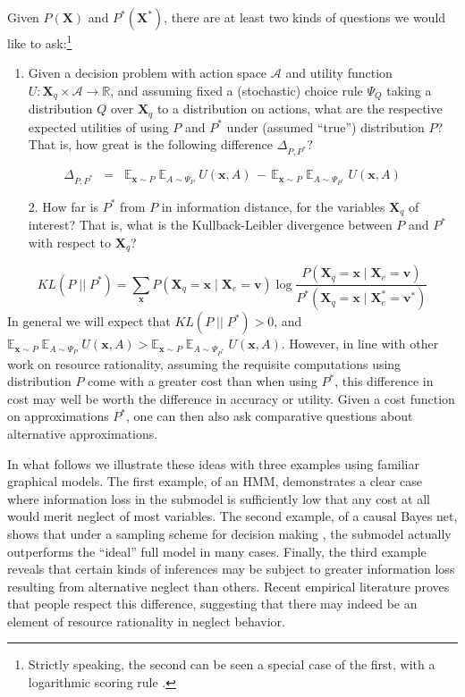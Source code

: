 \documentclass[10pt,letterpaper]{article}
\begin{document}
Given $P(\textbf{X})$ and $P^*(\textbf{X}^*)$, there are at least two kinds of questions we would like to ask:\footnote{Strictly speaking, the second can be seen a special case of the first, with a logarithmic scoring rule \citep{Bernardo}.} \begin{enumerate}
  \item Given a decision problem with action space $\mathcal{A}$ and utility function $U:\textbf{X}_q\times \mathcal{A} \rightarrow\mathbb{R}$, and assuming fixed a (stochastic) choice rule $\Psi_Q$ taking a distribution $Q$ over $\textbf{X}_q$ to a distribution on actions, what are the respective expected utilities of using $P$ and $P^*$ under (assumed ``true'') distribution $P$? That is, how great is the following difference $\Delta_{P,P^*}$? \end{enumerate}
  $$\Delta_{P,P^*} \;\; = \;\; \mathbb{E}_{\textbf{x}\sim P}\;\mathbb{E}_{A \sim \Psi_{P}}\;U(\textbf{x},A) \,-\, \mathbb{E}_{\textbf{x} \sim P}\;\mathbb{E}_{A \sim \Psi_{P^*}}\;U(\textbf{x},A)$$
  \begin{enumerate}
  \item[2.] How far is $P^*$ from $P$ in information distance, for the variables $\textbf{X}_q$ of interest? That is, what is the Kullback-Leibler divergence between $P$ and $P^*$ with respect to $\textbf{X}_q$?
\end{enumerate}$$KL(P \;||\; P^*)  =  \sum_{\textbf{x}} P(\textbf{X}_q = \textbf{x} \mid \textbf{X}_{e} = \textbf{v})\; \mbox{log} \; \frac{P(\textbf{X}_q = \textbf{x} \mid \textbf{X}_{e} = \textbf{v})}{P^*(\textbf{X}_q = \textbf{x} \mid \textbf{X}^*_{e} = \textbf{v}^*)}$$ In general we will expect that $KL(P \;||\; P^*) > 0$, and $\mathbb{E}_{\textbf{x}\sim P}\;\mathbb{E}_{A \sim \Psi_{P}}\;U(\textbf{x},A) > \mathbb{E}_{\textbf{x} \sim P}\;\mathbb{E}_{A \sim \Psi_{P^*}}\;U(\textbf{x},A)$. However, in line with other work on resource rationality, assuming the requisite computations using distribution $P$ come with a greater cost than when using $P^*$, this difference in cost may well be worth the difference in accuracy or utility. Given a cost function on approximations $P^*$, one can then also ask comparative questions about alternative approximations.

In what follows we illustrate these ideas with three examples using familiar graphical models. The first example, of an HMM, demonstrates a clear case where information loss in the submodel is sufficiently low that any cost at all would merit neglect of most variables. The second example, of a causal Bayes net, shows that under a sampling scheme for decision making \citep{Vul2014}, the submodel actually outperforms the ``ideal'' full model in many cases. Finally, the third example reveals that certain kinds of inferences may be subject to greater information loss resulting from alternative neglect than others. Recent empirical literature proves that people respect this difference, suggesting that there may indeed be an element of resource rationality in neglect behavior.
\end{document}
